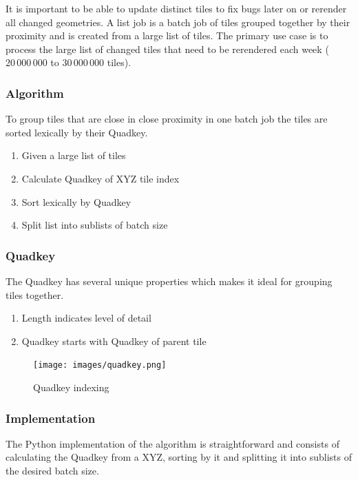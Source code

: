 It is important to be able to update distinct tiles to fix bugs later on or rerender all changed geometries. A list job is a batch job of tiles grouped together by their proximity and is created from a large list of tiles. The primary use case is to process the large list of changed tiles that need to be rerendered each week ($20\,000\,000$ to $30\,000\,000$ tiles).

\subsubsection*{Algorithm}

To group tiles that are close in close proximity in one batch job the tiles are sorted lexically by their Quadkey.

\begin{enumerate}  
    \item Given a large list of tiles
    \item Calculate Quadkey of XYZ tile index
    \item Sort lexically by Quadkey
    \item Split list into sublists of batch size
\end{enumerate}

\subsubsection*{Quadkey}

The Quadkey has several unique properties which makes it ideal for grouping
tiles together.

\begin{enumerate}  
    \item Length indicates level of detail
    \item Quadkey starts with Quadkey of parent tile
\end{enumerate}

\begin{figure}[H]
  \centering
  \texttt{[image: images/quadkey.png]}
  \caption{Quadkey indexing}
\end{figure}

\subsubsection*{Implementation}

The Python implementation of the algorithm is straightforward and consists of
calculating the Quadkey from a XYZ, sorting by it and splitting it into
sublists of the desired batch size.

